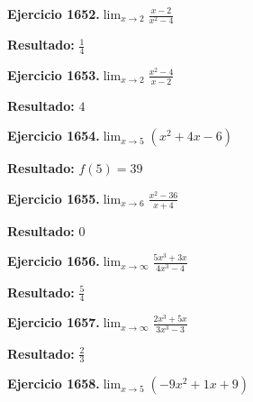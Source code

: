 \documentclass[10pt,a4paper]{article}
\begin{document}
\begin{ejbox}
\textbf{Ejercicio 1652.}\quad $\lim_{x\to 2} \frac{x-2}{x^2-4}$
\end{ejbox}

\begin{solbox}
\textbf{Resultado:} \(\displaystyle \frac{1}{4}\)
\end{solbox}

\begin{ejbox}
\textbf{Ejercicio 1653.}\quad $\lim_{x\to 2} \frac{x^2-4}{x-2}$
\end{ejbox}

\begin{solbox}
\textbf{Resultado:} \(\displaystyle 4\)
\end{solbox}

\newpage
\begin{ejbox}
\textbf{Ejercicio 1654.}\quad $\lim_{x\to 5} (x^2 +4x -6)$
\end{ejbox}

\begin{solbox}
\textbf{Resultado:} \(\displaystyle f(5) = 39\)
\end{solbox}

\begin{ejbox}
\textbf{Ejercicio 1655.}\quad $\lim_{x\to 6} \frac{x^2-36}{x+4}$
\end{ejbox}

\begin{solbox}
\textbf{Resultado:} \(\displaystyle 0\)
\end{solbox}

\begin{ejbox}
\textbf{Ejercicio 1656.}\quad $\lim_{x\to \infty} \frac{5x^3 + 3x}{4x^3 - 4}$
\end{ejbox}

\begin{solbox}
\textbf{Resultado:} \(\displaystyle \frac{5}{4}\)
\end{solbox}

\newpage
\begin{ejbox}
\textbf{Ejercicio 1657.}\quad $\lim_{x\to \infty} \frac{2x^3 + 5x}{3x^3 - 3}$
\end{ejbox}

\begin{solbox}
\textbf{Resultado:} \(\displaystyle \frac{2}{3}\)
\end{solbox}

\begin{ejbox}
\textbf{Ejercicio 1658.}\quad $\lim_{x\to 5} (-9x^2 +1x +9)$
\end{ejbox}
\end{document}
